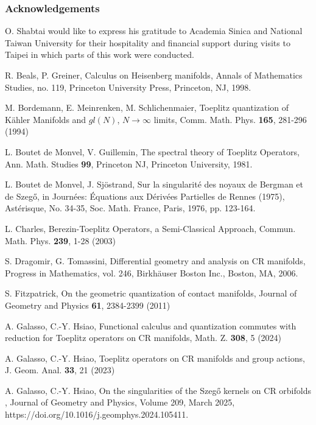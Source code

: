 \documentclass{article}
\begin{document}
%
\subsubsection*{Acknowledgements}
%
O. Shabtai would like to express his gratitude to Academia Sinica and National Taiwan University for their hospitality and financial support during visits to Taipei in which parts of this work were conducted.
\begin{thebibliography}{}
%
R. Beals, P. Greiner, Calculus on Heisenberg manifolds, Annals of Mathematics Studies, no. 119, Princeton University Press, Princeton, NJ, 1998.

M. Bordemann, E. Meinrenken, M. Schlichenmaier, Toeplitz quantization of K\"{a}hler Manifolds and $gl(N)$, $N \to \infty$ limits, Comm. Math. Phys. {\bf 165}, 281-296 (1994)

L. Boutet de Monvel, V. Guillemin, The spectral theory of Toeplitz Operators, Ann. Math. Studies {\bf 99}, Princeton NJ, Princeton University, 1981.

L. Boutet de Monvel, J. Sj\"{o}strand, Sur la singularit\'{e} des noyaux de Bergman et de Szeg\H{o}, in Journ\'{e}es: \'{E}quations aux D\'{e}riv\'{e}es Partielles de Rennes (1975), Ast\'{e}risque, No. 34-35, Soc. Math. France, Paris, 1976, pp. 123-164.

L. Charles, Berezin-Toeplitz Operators, a Semi-Classical Approach, Commun. Math. Phys. {\bf 239}, 1-28 (2003)
%

S. Dragomir, G. Tomassini, Differential geometry and analysis on CR manifolds, Progress in Mathematics, vol. 246, Birkh\"{a}user Boston Inc., Boston, MA, 2006.

S. Fitzpatrick, On the geometric quantization of contact manifolds, Journal of Geometry and Physics {\bf 61}, 2384-2399 (2011)

A. Galasso, C.-Y. Hsiao, Functional calculus and quantization commutes with reduction for Toeplitz operators on CR manifolds, Math. Z. {\bf 308}, 5 (2024)

A. Galasso, C.-Y. Hsiao, Toeplitz operators on CR manifolds and group actions, J. Geom. Anal. {\bf 33}, 21 (2023)

A. Galasso, C.-Y. Hsiao, On the singularities of the Szeg\H{o} kernels on CR orbifolds , Journal of Geometry and Physics, Volume 209, March 2025, https://doi.org/10.1016/j.geomphys.2024.105411.


\end{thebibliography}
\end{document}
